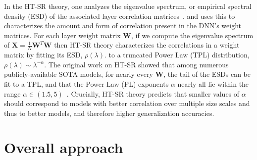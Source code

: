 \documentclass{article}
\begin{document}
In the HT-SR theory, one analyzes the eigenvalue spectrum, or empirical spectral density (ESD) 
of the associated layer correlation matrices~\citep{MM18_TR,MM19_HTSR_ICML,MM20_SDM}.
and uses this to characterizes the amount and form of correlation present in the DNN's weight matrices.
For each layer weight matrix $\mathbf{W}$, if we compute the eigenvalue spectrum of 
$ \mathbf{X} = \frac{1}{N}\mathbf{W}^{T}\mathbf{W} $
then HT-SR theory characterizes the correlations in a weight matrix by fitting its ESD, $\rho(\lambda)$.
to a truncated Power Law (TPL) distribution,  $\rho(\lambda)\sim\lambda^{-\alpha} $.
%
The original work on HT-SR showed that among numerous publicly-available SOTA models, for nearly every $\mathbf{W}$,  the tail of the ESDs can be fit to a  TPL, and that
the Power Law (PL) exponents $\alpha$ nearly all lie within the range $\alpha\in(1.5,5)$~\citep{MM18_TR,MM19_HTSR_ICML,MM20_SDM}.
%
%
Crucially, HT-SR theory predicts that smaller values of $\alpha$ should correspond to models with better correlation over multiple size scales and thus to better models,
and therefore higher generalization accuracies.


\section*{Overall approach}
\end{document}
